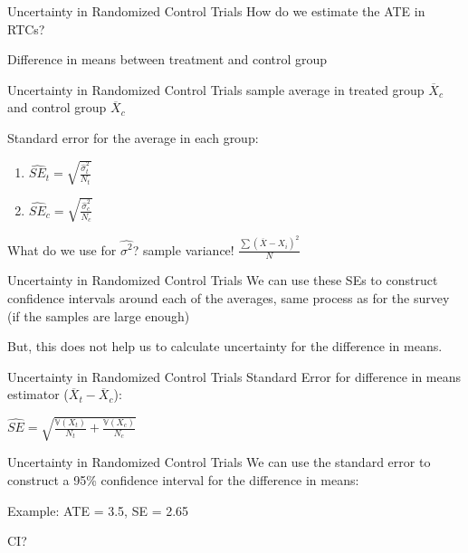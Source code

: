 \documentclass[presentation]{beamer}
\newcommand{\V}{\mathbb{V}}
\begin{document}
\begin{frame}[label={sec:orga2ca7c4}]{Uncertainty in Randomized Control Trials}
How do we estimate the ATE in RTCs?

\pause

Difference in means between treatment and control group
\end{frame}

\begin{frame}[label={sec:orgb035aa6}]{Uncertainty in Randomized Control Trials}
sample average in treated group \(\overline{X}_{c}\) and control group \(\overline{X}_{c}\)

\pause


Standard error for the average in each group:
\begin{enumerate}
\item \(\hat{SE}_{t} = \sqrt{\frac{\hat{\sigma}^{2}_{t}}{N_{t}}}\)
\item \(\hat{SE}_{c} = \sqrt{\frac{\hat{\sigma}^{2}_{c}}{N_{c}}}\)
\end{enumerate}

What do we use for \(\hat{\sigma^{2}}\)?
\pause
sample variance! \(\frac{\sum (\overline{X} - X_{i})^{2}}{N}\)
\end{frame}

\begin{frame}[label={sec:org3b65bd1}]{Uncertainty in Randomized Control Trials}
We can use these SEs to construct confidence intervals around each of the averages, same process as for the survey (\alert{if the samples are large enough})

But, this does not help us to calculate uncertainty for the difference in means.
\end{frame}


\begin{frame}[label={sec:org26fb154}]{Uncertainty in Randomized Control Trials}
Standard Error for difference in means estimator (\(\overline{X}_{t} - \overline{X}_{c}\)):

\(\hat{SE} = \sqrt{\frac{\V(X_{t})}{N_{t}} + \frac{\V(X_{c})}{N_{c}}}\)
\end{frame}

\begin{frame}[label={sec:org6ba0ec5}]{Uncertainty in Randomized Control Trials}
We can use the standard error to construct a 95\% confidence interval for the difference in means:

Example: ATE = 3.5, SE = 2.65

CI?
\end{frame}
\end{document}
